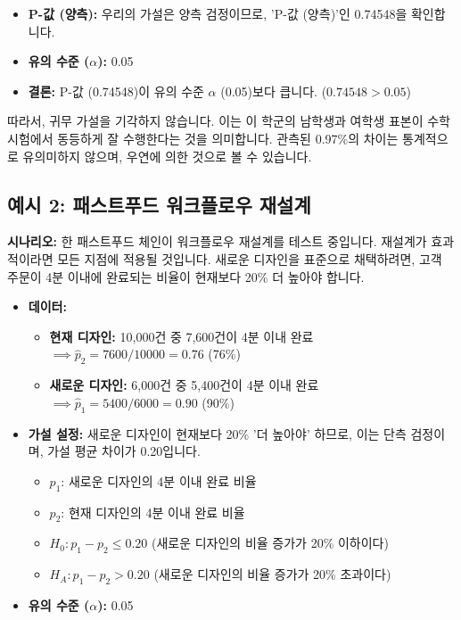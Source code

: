 \documentclass[11pt,a4paper]{article}
\begin{document}
\begin{itemize}
    \item \textbf{P-값 (양측):} 우리의 가설은 양측 검정이므로, 'P-값 (양측)'인 0.74548을 확인합니다.
    \item \textbf{유의 수준 ($\alpha$):} 0.05
    \item \textbf{결론:} P-값 (0.74548)이 유의 수준 $\alpha$ (0.05)보다 큽니다. ($0.74548 > 0.05$)
\end{itemize}
따라서, 귀무 가설을 기각하지 않습니다. 이는 이 학군의 남학생과 여학생 표본이 수학 시험에서 동등하게 잘 수행한다는 것을 의미합니다. 관측된 0.97\%의 차이는 통계적으로 유의미하지 않으며, 우연에 의한 것으로 볼 수 있습니다.

\subsection*{예시 2: 패스트푸드 워크플로우 재설계}
\begin{examplebox}
\textbf{시나리오:}
한 패스트푸드 체인이 워크플로우 재설계를 테스트 중입니다. 재설계가 효과적이라면 모든 지점에 적용될 것입니다. 새로운 디자인을 표준으로 채택하려면, 고객 주문이 4분 이내에 완료되는 비율이 현재보다 20\% 더 높아야 합니다.
\end{examplebox}

\begin{itemize}
    \item \textbf{데이터:}
    \begin{itemize}
        \item \textbf{현재 디자인:} 10,000건 중 7,600건이 4분 이내 완료 $\implies \hat{p}_2 = 7600/10000 = 0.76$ (76\%)
        \item \textbf{새로운 디자인:} 6,000건 중 5,400건이 4분 이내 완료 $\implies \hat{p}_1 = 5400/6000 = 0.90$ (90\%)
    \end{itemize}
    \item \textbf{가설 설정:} 새로운 디자인이 현재보다 20\% '더 높아야' 하므로, 이는 단측 검정이며, 가설 평균 차이가 0.20입니다.
    \begin{itemize}
        \item $p_1$: 새로운 디자인의 4분 이내 완료 비율
        \item $p_2$: 현재 디자인의 4분 이내 완료 비율
        \item $H_0: p_1 - p_2 \le 0.20$ (새로운 디자인의 비율 증가가 20\% 이하이다)
        \item $H_A: p_1 - p_2 > 0.20$ (새로운 디자인의 비율 증가가 20\% 초과이다)
    \end{itemize}
    \item \textbf{유의 수준 ($\alpha$):} 0.05
\end{itemize}
\end{document}
